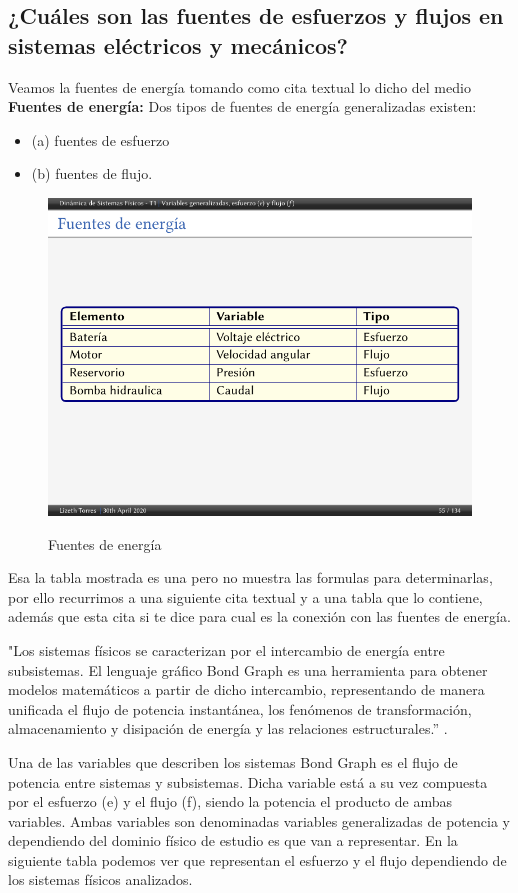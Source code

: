 \subsection{¿Cuáles son las fuentes de esfuerzos y flujos en sistemas eléctricos y mecánicos?}

Veamos la fuentes de energía tomando como cita textual lo dicho del medio \cite{w1}\\

\textbf{Fuentes de energía:} Dos tipos de fuentes de energía generalizadas
existen: 
\begin{itemize}
	\item (a) fuentes de esfuerzo
	\item (b) fuentes de flujo.
\end{itemize}

\begin{figure}[H]
	\centering
	\caption{Fuentes de energía \cite{w1}}
	\includegraphics[width=0.7\linewidth]{latex/tabla5}
	\label{fig:tabla5}
\end{figure}


Esa la tabla mostrada es una pero no muestra las formulas para determinarlas, por ello recurrimos a una siguiente cita textual y a una tabla que lo contiene, además que esta cita si te dice para cual es la conexión con las fuentes de energía.

"Los sistemas físicos se caracterizan por el intercambio de energía entre subsistemas. El lenguaje gráfico Bond Graph es una herramienta para obtener modelos matemáticos a partir de dicho intercambio, representando de manera unificada el flujo de potencia instantánea, los fenómenos de transformación, almacenamiento y disipación de energía y las relaciones estructurales.” \cite{w2}.

Una de las variables que describen los sistemas Bond Graph es el flujo de potencia entre sistemas y subsistemas. Dicha variable está a su vez compuesta por el esfuerzo (e) y el flujo (f), siendo la potencia el producto de ambas variables. Ambas variables son denominadas variables generalizadas de potencia y dependiendo del dominio físico de estudio es que van a representar. En la siguiente tabla podemos ver que representan el esfuerzo y el flujo dependiendo de los sistemas físicos analizados.

